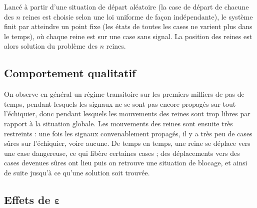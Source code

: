 \documentclass[11pt, openany]{article}
\begin{document}
Lancé à partir d'une situation de départ aléatoire (la case de départ de chacune des $n$ reines est choisie selon une loi uniforme de façon indépendante), le système finit par atteindre un point fixe (les états de toutes les cases ne varient plus dans le temps), où chaque reine est sur une case sans signal. La position des reines est alors solution du problème des $n$ reines.

\subsection*{Comportement qualitatif}

On observe en général un régime transitoire sur les premiers milliers de pas de temps, pendant lesquels les signaux ne se sont pas encore propagés sur tout l'échiquier, donc pendant lesquels les mouvements des reines sont trop libres par rapport à la situation globale. Les mouvements des reines sont ensuite très restreints : une fois les signaux convenablement propagés, il y a très peu de cases sûres sur l'échiquier, voire aucune. De temps en temps, une reine se déplace vers une case dangereuse, ce qui libère certaines cases ; des déplacements vers des cases devenues sûres ont lieu puis on retrouve une situation de blocage, et ainsi de suite jusqu'à ce qu'une solution soit trouvée.

\subsection*{Effets de $\boldsymbol \varepsilon$}
\end{document}
